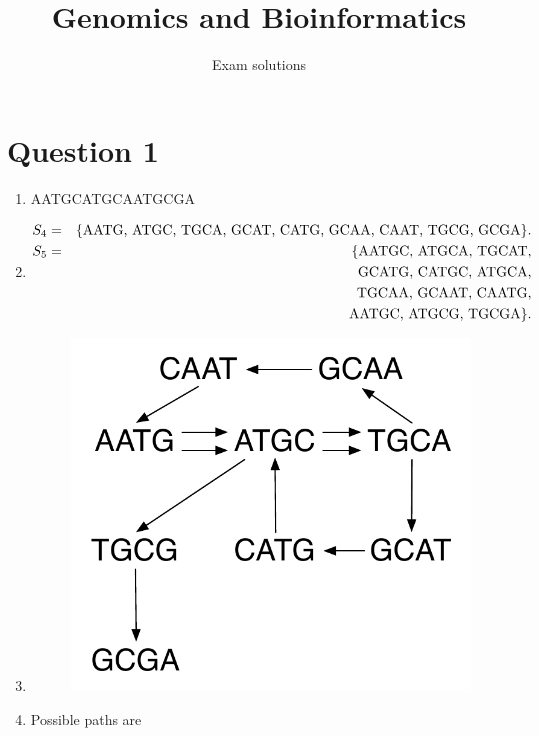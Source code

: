 \documentclass[a4paper,11pt]{article}
\title{Genomics and Bioinformatics}
\author{Exam solutions}
\begin{document}
\maketitle

\section*{Question 1}

\begin{enumerate}
\item %
AATGCATGCAATGCGA
\item 
\begin{eqnarray*}
S_4 &=& \{\mbox{AATG, ATGC, TGCA, GCAT, CATG, GCAA, CAAT, TGCG, GCGA}\}.\\
  S_5&=&\{\mbox{AATGC, ATGCA, TGCAT,} \\
  &&\phantom\{\mbox{GCATG, CATGC, ATGCA,} \\
  &&\phantom\{\mbox{TGCAA, GCAAT, CAATG,} \\
  &&\phantom\{\mbox{AATGC, ATGCG, TGCGA}\}.
\end{eqnarray*}
\item \phantom{XXXX}
\begin{figure}[h]
\centering\includegraphics[scale=.5]{exam_graph_fig1.pdf}
\end{figure}
\item 
Possible paths are\\\\

\end{enumerate}
\end{document}
